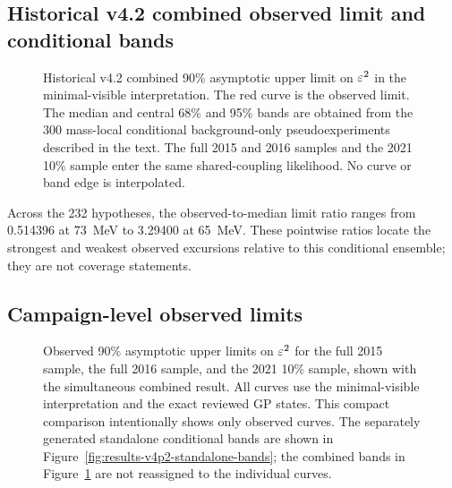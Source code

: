 \subsection{Historical v4.2 combined observed limit and conditional bands}
\label{sec:results-v4p2-combined-limit}
\label{sec:results-v4-combined-limit}

\begin{figure}[H]
\centering
{}
\caption{Historical v4.2 combined 90\% asymptotic \CLs{} upper limit on $\varepsilon^2$ in the
minimal-visible interpretation. The red curve is the observed limit. The median
and central 68\% and 95\% bands are obtained from the 300 mass-local
conditional background-only pseudoexperiments described in the text. The full
2015 and 2016
samples and the 2021 10\% sample enter the same shared-coupling likelihood. No
curve or band edge is interpolated.}
\label{fig:results-v4p2-combined-band}
\end{figure}

Across the 232 hypotheses, the observed-to-median limit ratio ranges from
0.514396 at 73~MeV to 3.29400 at 65~MeV. These pointwise ratios locate the
strongest and weakest observed excursions relative to this conditional ensemble;
they are not coverage statements.

\subsection{Campaign-level observed limits}
\label{sec:results-v4p2-individual-limits}

\begin{figure}[H]
\centering
{}
\caption{Observed 90\% asymptotic \CLs{} upper limits on $\varepsilon^2$ for the full
2015 sample, the full 2016 sample, and the 2021 10\% sample, shown with the
simultaneous combined result. All curves use the minimal-visible interpretation
and the exact reviewed GP states. This compact comparison intentionally shows
only observed curves. The separately generated standalone conditional bands
are shown in Figure~\ref{fig:results-v4p2-standalone-bands}; the combined bands
in Figure~\ref{fig:results-v4p2-combined-band} are not reassigned to the
individual curves.}
\label{fig:results-v4p2-individual-limits}
\end{figure}

